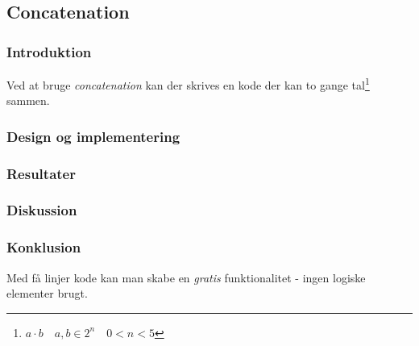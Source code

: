 \subsection{Concatenation}

\subsubsection{Introduktion}
Ved at bruge \textit{concatenation} kan der skrives en kode der kan to gange tal\footnote{$a\cdot b \quad a,b \in 2^n \quad 0 < n < 5  $} sammen.
\subsubsection{Design og implementering}



\subsubsection{Resultater}




\subsubsection{Diskussion}

\subsubsection{Konklusion}

Med få linjer kode kan man skabe en \emph{gratis} funktionalitet - ingen logiske elementer brugt.

